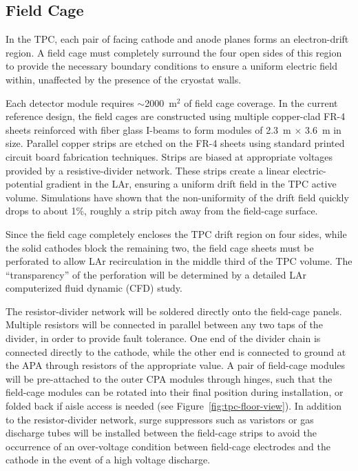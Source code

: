 {%
\subsection{Field Cage}
\label{subsec:fd-ref-fieldcage}

In the TPC, each pair of facing cathode and anode planes forms an
electron-drift region. A field cage must completely surround the four
open sides of this region to provide the necessary boundary conditions
to ensure a uniform electric field within, unaffected by the presence
of the cryostat walls.


Each  detector module requires $\sim$2000~m$^2$ of field
cage coverage. In the current reference design, the field cages are
constructed using multiple copper-clad FR-4 sheets reinforced with
fiber glass I-beams to form modules of 2.3~m $\times$ 3.6~m in
size. Parallel copper strips are etched on the FR-4 sheets using
standard printed circuit board fabrication techniques. Strips are
biased at appropriate voltages provided by a resistive-divider 
network. These strips create a linear electric-potential gradient in
the LAr, ensuring a uniform drift field in the TPC active volume. 
Simulations have shown that the non-uniformity of the drift field quickly
drops to about 1\%, roughly a strip pitch away from the field-cage
surface.

Since the field cage completely encloses the TPC drift region on four
sides, while the solid cathodes block the remaining two, the field
cage sheets must be perforated to allow LAr recirculation in
the middle third of the TPC volume. The ``transparency'' of the
perforation will be determined by a detailed LAr computerized fluid
dynamic (CFD) study.

The resistor-divider network will be soldered directly onto the
field-cage panels. Multiple resistors will be connected in parallel
between any two taps of the divider, in order to provide fault
tolerance.  One end of the divider chain is connected directly to the
cathode, while the other end is connected to ground at the APA through
resistors of the appropriate value.  A pair of field-cage modules will
be pre-attached to the outer CPA modules through hinges, such that the
field-cage modules can be rotated into their final position during
installation, or folded back if aisle access is needed (see
Figure~\ref{fig:tpc-floor-view}).  In addition to the resistor-divider
network, surge suppressors such as varistors or gas discharge tubes
will be installed between the field-cage strips to avoid the
occurrence of an over-voltage condition between field-cage electrodes
and the cathode in the event of a high voltage discharge.

}
